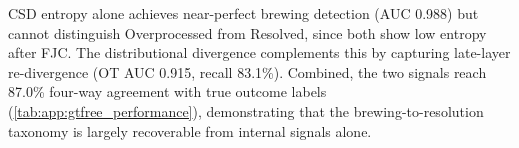 \begin{table}[H]
\centering
\caption{GT-free outcome discrimination performance on the anchor setting (Qwen2.5-Coder-7B). Brewing AUC measures the ability to detect brewing-phase boundaries; OT AUC and OT Recall measure Overprocessed detection; Overall Agree is the four-way agreement with true outcome labels.}
\label{tab:app:gtfree_performance}
\end{table}

CSD entropy alone achieves near-perfect brewing detection (AUC 0.988) but cannot distinguish Overprocessed from Resolved, since both show low entropy after FJC.
The distributional divergence complements this by capturing late-layer re-divergence (OT AUC 0.915, recall 83.1\%).
Combined, the two signals reach 87.0\% four-way agreement with true outcome labels (\cref{tab:app:gtfree_performance}), demonstrating that the brewing-to-resolution taxonomy is largely recoverable from internal signals alone.
